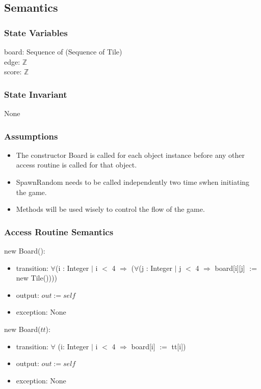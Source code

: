 \documentclass[12pt]{article}
\begin{document}
\subsection* {Semantics}

\subsubsection* {State Variables}

board: Sequence of (Sequence of Tile) \\
edge: $\mathbb{Z}$ \\
score: $\mathbb{Z}$

\subsubsection* {State Invariant}

None

\subsubsection* {Assumptions}

\begin{itemize}
  \item The constructor Board is called for each object instance before any other access routine
  is called for that object.
  \item SpawnRandom needs to be called independently two time swhen initiating the game.
  \item Methods will be used wisely to control the flow of the game.
\end{itemize}

\subsubsection* {Access Routine Semantics}

new Board():
\begin{itemize}
\item transition: $\forall$(i : Integer $|$ i $<$ 4 $\Rightarrow$ ($\forall$(j : Integer $|$ j $<$ 4 $\Rightarrow$ board[i][j] $:=$ new Tile())))
\item output: $out := \mathit{self}$
\item exception: None
\end{itemize}

\noindent new Board($tt$):
\begin{itemize}
\item transition: $\forall$ (i: Integer $|$ i $<$ 4 $\Rightarrow$ board[i] $:=$ tt[i])
\item output: $out := \mathit{self}$
\item exception: None
\end{itemize}
\end{document}
